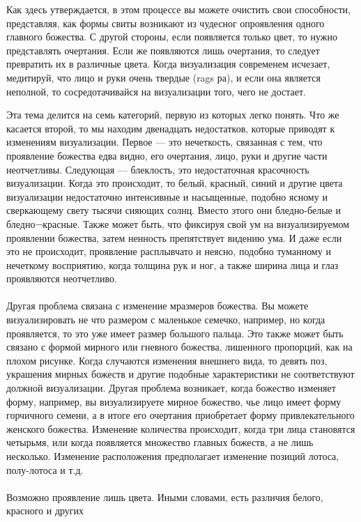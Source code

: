 Как здесь утверждается, в этом процессе вы можете очистить свои способности,
представляя, как формы свиты возникают из чудесног опроявления одного главного
божества. С другой стороны, если появляется только цвет, то нужно представлять очертания.
Если же появляются лишь очертания, то следует превратить их в различные цвета. Когда
визуализация современем исчезает, медитируй, что лицо и руки очень твердые (rags ра), и
если она является неполной, то сосредо\-тачивайся на визуализации того, чего не достает.
\\
\begin{siderules}
Эта тема делится на семь категорий, первую из которых легко понять. Что же касается
второй, то мы находим двенадцать недостатков, которые приводят к изменениям
визуализации. Первое — это нечеткость, связанная с тем, что проявление божества едва
видно, его очертания, лицо, руки и другие части неотчетливы. Следующая — блеклость, это
недостаточная красочность визуализации. Когда это происходит, то белый, красный, синий и
другие цвета визуализации недостаточно интенсивные и насыщенные, подобно ясному и
сверкающему свету тысячи сияющих солнц. Вместо этого они бледно-белые и бледно¬красные.
Также может быть, что фиксируя свой ум на визуализируемом проявлении
божества, затем ненность препятствует видению ума. И даже если это не происходит,
проявление расплывчато и неясно, подобно туманному и нечеткому восприятию, когда
толщина рук и ног, а также ширина лица и глаз проявляются неотчетливо.\\
\\
Другая проблема связана с изменение мразмеров божества. Вы можете визуализировать
не что размером с маленькое семечко, например, но когда проявляется, то это уже имеет
размер большого пальца. Это также может быть связано с формой мирного или гневного
божества, лишенного пропорций, как на плохом рисунке. Когда случаются изменения
внешнего вида, то девять поз, украшения мирных божеств и другие подобные
характеристики не со\-ответствуют должной визуализации. Другая проблема возникает, когда
божество изменяет форму, например, вы визуализируете мирное божество, чье лицо имеет
форму горчичного семени, а в итоге его очертания приобретает форму привлекательного
женского божества. Изменение количества происходит, когда три лица становятся четырьмя,
или когда появляется множество главных божеств, а не лишь несколько. Изменение
расположения предполагает изменение позиций лотоса, полу-лотоса и т.д.\\
\\
Возможно проявление лишь цвета. Иными словами, есть различия белого, красного и других

\end{siderules}
